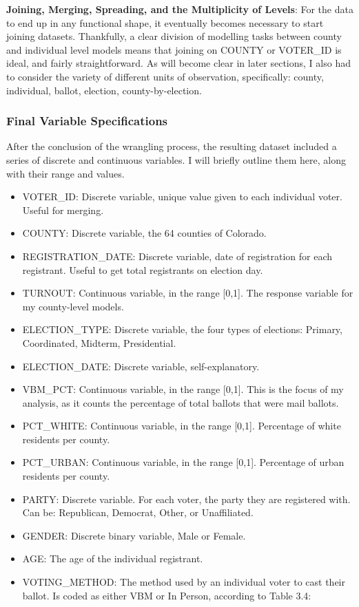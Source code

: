 \documentclass[]{article}
\providecommand{\tightlist}{%
  \setlength{\itemsep}{0pt}\setlength{\parskip}{0pt}}
\begin{document}
\textbf{Joining, Merging, Spreading, and the Multiplicity of Levels}:
For the data to end up in any functional shape, it eventually becomes
necessary to start joining datasets. Thankfully, a clear division of
modelling tasks between county and individual level models means that
joining on COUNTY or VOTER\_ID is ideal, and fairly straightforward. As
will become clear in later sections, I also had to consider the variety
of different units of observation, specifically: county, individual,
ballot, election, county-by-election.

\subsubsection{Final Variable
Specifications}\label{final-variable-specifications}

After the conclusion of the wrangling process, the resulting dataset
included a series of discrete and continuous variables. I will briefly
outline them here, along with their range and values.

\begin{itemize}
\tightlist
\item
  VOTER\_ID: Discrete variable, unique value given to each individual
  voter. Useful for merging.
\item
  COUNTY: Discrete variable, the 64 counties of Colorado.
\item
  REGISTRATION\_DATE: Discrete variable, date of registration for each
  registrant. Useful to get total registrants on election day.
\item
  TURNOUT: Continuous variable, in the range {[}0,1{]}. The response
  variable for my county-level models.
\item
  ELECTION\_TYPE: Discrete variable, the four types of elections:
  Primary, Coordinated, Midterm, Presidential.
\item
  ELECTION\_DATE: Discrete variable, self-explanatory.
\item
  VBM\_PCT: Continuous variable, in the range {[}0,1{]}. This is the
  focus of my analysis, as it counts the percentage of total ballots
  that were mail ballots.
\item
  PCT\_WHITE: Continuous variable, in the range {[}0,1{]}. Percentage of
  white residents per county.
\item
  PCT\_URBAN: Continuous variable, in the range {[}0,1{]}. Percentage of
  urban residents per county.
\item
  PARTY: Discrete variable. For each voter, the party they are
  registered with. Can be: Republican, Democrat, Other, or Unaffiliated.
\item
  GENDER: Discrete binary variable, Male or Female.
\item
  AGE: The age of the individual registrant.
\item
  VOTING\_METHOD: The method used by an individual voter to cast their
  ballot. Is coded as either VBM or In Person, according to Table 3.4:
\end{itemize}
\end{document}
